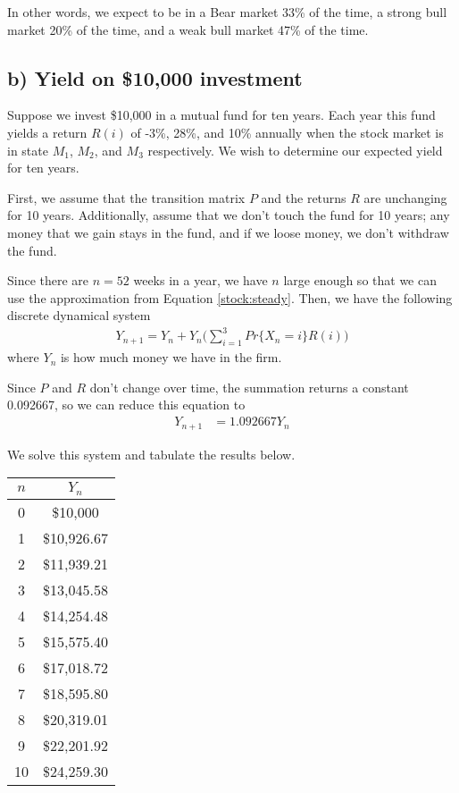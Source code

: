 \documentclass[11pt,letterpaper]{article}
\begin{document}
In other words, we expect to be in a Bear market 33\% of the time, a strong bull market 20\% of the time, and a weak bull market 47\% of the time.







\subsection*{b) Yield on \$10,000 investment}

Suppose we invest \$10,000 in a mutual fund for ten years. Each year this fund yields a return $R(i)$ of -3\%, 28\%, and 10\% annually when the stock market is in state $M_1$, $M_2$, and $M_3$ respectively. We wish to determine our expected yield for ten years.

First, we assume that the transition matrix $P$ and the returns $R$ are unchanging for 10 years. Additionally, assume that we don't touch the fund for 10 years; any money that we gain stays in the fund, and if we loose money, we don't withdraw the fund.

Since there are $n = 52$ weeks in a year, we have $n$ large enough so that we can use the approximation from Equation \eqref{stock:steady}. Then, we have the following discrete dynamical system
\begin{align*}
Y_{n+1} = Y_n + Y_n \Bigg( \sum_{i=1}^3 Pr\{X_n = i\} R(i) \Bigg)
\end{align*}
where $Y_n$ is how much money we have in the firm.

Since $P$ and $R$ don't change over time, the summation returns a constant 0.092667, so we can reduce this equation to
\begin{align} \label{stock:dynamics}
Y_{n+1} & = 1.092667 Y_n
\end{align}

We solve this system and tabulate the results below.
\begin{center}
	\begin{tabular}{c | c}
    $n$ & $Y_n$ \\
    \hline
    0 & \$10,000 \\
    1 & \$10,926.67 \\
    2 & \$11,939.21\\
    3 & \$13,045.58 \\
    4 & \$14,254.48 \\
    5 & \$15,575.40 \\
    6 & \$17,018.72 \\
    7 & \$18,595.80 \\
    8 & \$20,319.01 \\
    9 & \$22,201.92 \\
    10 & \$24,259.30 \\
    \end{tabular}
\end{center}
\end{document}
